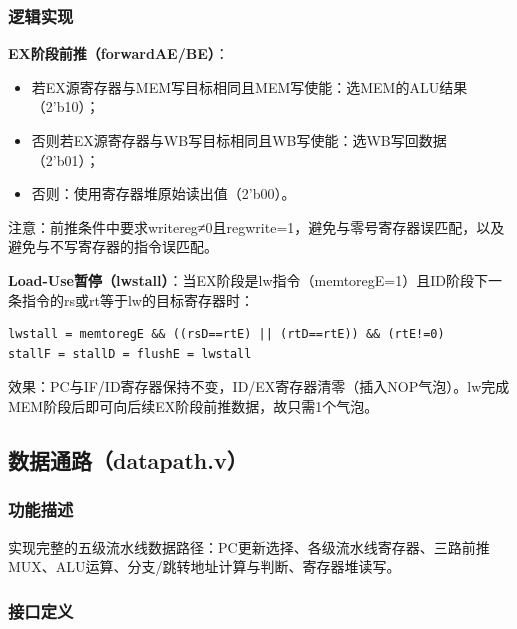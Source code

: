 \subsubsection{逻辑实现}

\textbf{EX阶段前推（forwardAE/BE）}：

\begin{itemize}
    \item 若EX源寄存器与MEM写目标相同且MEM写使能：选MEM的ALU结果（2'b10）；
    \item 否则若EX源寄存器与WB写目标相同且WB写使能：选WB写回数据（2'b01）；
    \item 否则：使用寄存器堆原始读出值（2'b00）。
\end{itemize}

注意：前推条件中要求writereg≠0且regwrite=1，避免与零号寄存器误匹配，以及避免与不写寄存器的指令误匹配。

\textbf{Load-Use暂停（lwstall）}：当EX阶段是lw指令（memtoregE=1）且ID阶段下一条指令的rs或rt等于lw的目标寄存器时：

\begin{verbatim}
lwstall = memtoregE && ((rsD==rtE) || (rtD==rtE)) && (rtE!=0)
stallF = stallD = flushE = lwstall
\end{verbatim}

效果：PC与IF/ID寄存器保持不变，ID/EX寄存器清零（插入NOP气泡）。lw完成MEM阶段后即可向后续EX阶段前推数据，故只需1个气泡。

\subsection{数据通路（datapath.v）}

\subsubsection{功能描述}

实现完整的五级流水线数据路径：PC更新选择、各级流水线寄存器、三路前推MUX、ALU运算、分支/跳转地址计算与判断、寄存器堆读写。

\subsubsection{接口定义}

